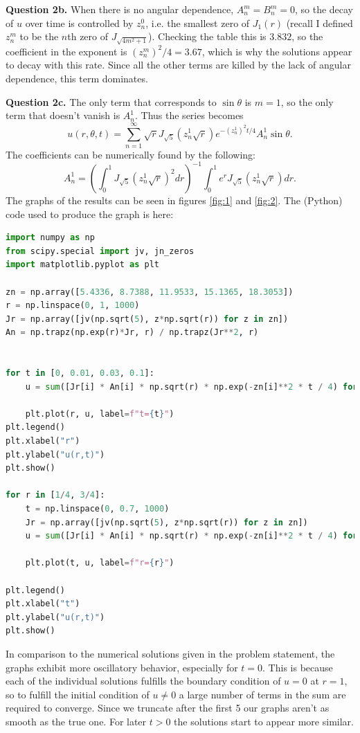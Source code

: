 \documentclass[letterpaper, reqno,11pt]{article}
\begin{document}
{\medskip\noindent\bf Question 2b.} When there is no angular dependence, $A_n^m=B_n^m=0$, so the decay of $u$ over time is controlled by $z_n^0$, i.e. the smallest zero of $J_{1}(r)$ (recall I defined $z_n^m$ to be the $n$th zero of $J_{\sqrt{4m^2+1} }$). Checking the table this is $3.832$, so the coefficient in the exponent is $(z_n^m)^2 /4=3.67$, which is why the solutions appear to decay with this rate. Since all the other terms are killed by the lack of angular dependence, this term dominates. 

{\medskip\noindent\bf Question 2c.} The only term that corresponds to $\sin\theta$ is $m=1$, so the only term that doesn't vanish is $A_n^1$. Thus the series becomes 
\[
u(r, \theta, t)=\sum_{n=1}^{\infty}\sqrt{r} J_{\sqrt{5} }\left( z_{n}^{1}\sqrt{r} \right) e^{-\left( z_n^1 \right) ^2t /4}A_n^1\sin \theta
.\]
The coefficients can be numerically found by the following: 
\[
A_n^1=\left( \int_0^1 J_{\sqrt{5}} \left( z_n^1\sqrt{r}\right)^2 dr  \right)^{-1}\int_0^1 e^{r} J_{\sqrt{5}} \left( z_n^1\sqrt{r}\right) dr
.\]
The graphs of the results can be seen in figures \ref{fig:1} and \ref{fig:2}. The (Python) code used to produce the graph is here:

\begin{lstlisting}[language=Python]
import numpy as np 
from scipy.special import jv, jn_zeros
import matplotlib.pyplot as plt

zn = np.array([5.4336, 8.7388, 11.9533, 15.1365, 18.3053])
r = np.linspace(0, 1, 1000)
Jr = np.array([jv(np.sqrt(5), z*np.sqrt(r)) for z in zn])
An = np.trapz(np.exp(r)*Jr, r) / np.trapz(Jr**2, r)


for t in [0, 0.01, 0.03, 0.1]:
    u = sum([Jr[i] * An[i] * np.sqrt(r) * np.exp(-zn[i]**2 * t / 4) for i in range(len(Jr))])

    plt.plot(r, u, label=f"t={t}")
plt.legend()
plt.xlabel("r")
plt.ylabel("u(r,t)")
plt.show()

for r in [1/4, 3/4]:
    t = np.linspace(0, 0.7, 1000)
    Jr = np.array([jv(np.sqrt(5), z*np.sqrt(r)) for z in zn])
    u = sum([Jr[i] * An[i] * np.sqrt(r) * np.exp(-zn[i]**2 * t / 4) for i in range(len(Jr))])

    plt.plot(t, u, label=f"r={r}")

plt.legend()
plt.xlabel("t")
plt.ylabel("u(r,t)")
plt.show()
\end{lstlisting}

In comparison to the numerical solutions given in the problem statement, the graphs exhibit more oscillatory behavior, especially for $t=0$. This is because each of the individual solutions fulfills the boundary condition of $u=0$ at $r=1$, so to fulfill the initial condition of $u\neq 0$ a large number of terms in the sum are required to converge. Since we truncate after the first 5 our graphs aren't as smooth as the true one. For later $t>0$ the solutions start to appear more similar. 
\end{document}
